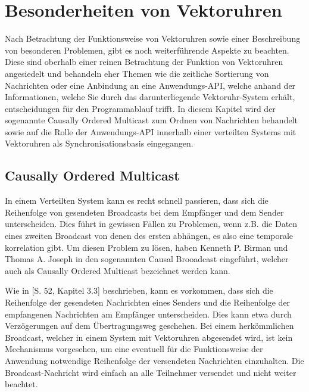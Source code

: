\section{Besonderheiten von Vektoruhren}

Nach Betrachtung der Funktionsweise von Vektoruhren sowie einer Beschreibung von besonderen Problemen, gibt es noch weiterführende Aspekte zu beachten. Diese sind oberhalb einer reinen Betrachtung der Funktion von Vektoruhren angesiedelt und behandeln eher Themen wie die zeitliche Sortierung von Nachrichten oder eine Anbindung an eine Anwendungs-API, welche anhand der Informationen, welche Sie durch das darunterliegende Vektoruhr-System erhält, entscheidungen für den Programmablauf trifft. In diesem Kapitel wird der sogenannte Causally Ordered Multicast zum Ordnen von Nachrichten behandelt sowie auf die Rolle der Anwendungs-API innerhalb einer verteilten Systems mit Vektoruhren als Synchronisationsbasis eingegangen.
\subsection{Causally Ordered Multicast}

In einem Verteilten System kann es recht schnell passieren, dass sich die Reihenfolge von gesendeten Broadcasts bei dem Empfänger und dem Sender unterscheiden. Dies führt in gewissen Fällen zu Problemen, wenn z.B. die Daten eines zweiten Broadcast von denen des ersten abhängen, es also eine temporale korrelation gibt. Um diesen Problem zu lösen, haben Kenneth P. Birman und Thomas A. Joseph in \cite{Birman:1987:RCP:7351.7478} den sogenannten Causal Brooadcast eingeführt, welcher auch als Causally Ordered Multicast bezeichnet werden kann.

Wie in \cite{Birman:1987:RCP:7351.7478}[S. 52, Kapitel 3.3] beschrieben, kann es vorkommen, dass sich die Reihenfolge der gesendeten Nachrichten eines Senders und die Reihenfolge der empfangenen Nachrichten am Empfänger unterscheiden. Dies kann etwa durch Verzögerungen auf dem Übertragungsweg geschehen. Bei einem herkömmlichen Broadcast, welcher in einem System mit Vektoruhren abgesendet wird, ist kein Mechanismus vorgesehen, um eine eventuell für die Funktionsweise der Anwendung notwendige Reihenfolge der versendeten Nachrichten einzuhalten. Die Broadcast-Nachricht wird einfach an alle Teilnehmer versendet und nicht weiter beachtet.

